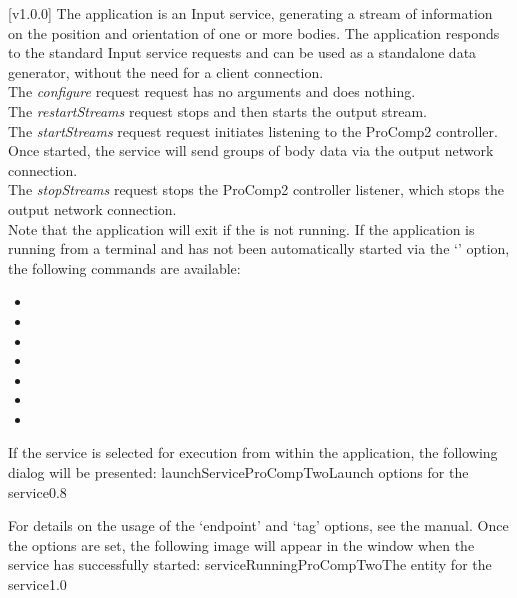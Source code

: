 [v1.0.0]
The  application is an Input service,
generating a stream of information on the position and orientation of one or more bodies.
The application responds to the standard Input service requests and can be used as a
standalone data generator, without the need for a client connection.\\

The \emph{configure} request request has no arguments and does nothing.\\

The \emph{restartStreams} request stops and then starts the output stream.\\

The \emph{startStreams} request request initiates listening to the ProComp2 controller.
Once started, the service will send groups of body data via the output \yarp{} network
connection.\\

The \emph{stopStreams} request stops the ProComp2 controller listener, which stops the
output \yarp{} network connection.\\ 

Note that the application will exit if the \emph{\RS} is not running.
\insertAppParameters
\insertTagDescription{\PCtwoI}
\insertInputServiceComment
\condPage{}
If the application is running from a terminal and has not been automatically started via
the `' option, the following commands are available:
\begin{itemize}
\item{}
\item\exSp{}
\item\exSp{}
\item\exSp{}
\item\exSp{}
\item\exSp{}
\item\exSp{}
\end{itemize}
\secondaryEnd
\condPage
{}
If the service is selected for execution from within the \emph{\CMU} application, the
following dialog will be presented:
%
{launchServiceProCompTwo}{Launch options for the \emph{\PCtwoI} service}{0.8}

For details on the usage of the `endpoint' and `tag' options, see the \emph{\CMU} manual.
Once the options are set, the following image will appear in the \emph{\CMU} window when
the service has successfully started:
%
{serviceRunningProCompTwo}{The \emph{\CMU} entity for the \emph{\PCtwoI} service}{1.0}
\secondaryEnd
\primaryEnd{}
